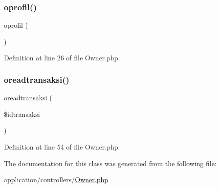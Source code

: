 \subsubsection{\texorpdfstring{oprofil()}{oprofil()}}
{\footnotesize\ttfamily oprofil (\begin{DoxyParamCaption}{ }\end{DoxyParamCaption})}



Definition at line 26 of file Owner.\+php.

\mbox{\label{class_owner_a84c84dad4d764fb54ea99d0e8643a159}} 
\subsubsection{\texorpdfstring{oreadtransaksi()}{oreadtransaksi()}}
{\footnotesize\ttfamily oreadtransaksi (\begin{DoxyParamCaption}\item[{}]{\$idtransaksi }\end{DoxyParamCaption})}



Definition at line 54 of file Owner.\+php.



The documentation for this class was generated from the following file\+:\begin{DoxyCompactItemize}
\item 
application/controllers/\mbox{\hyperlink{_owner_8php}{Owner.\+php}}\end{DoxyCompactItemize}
